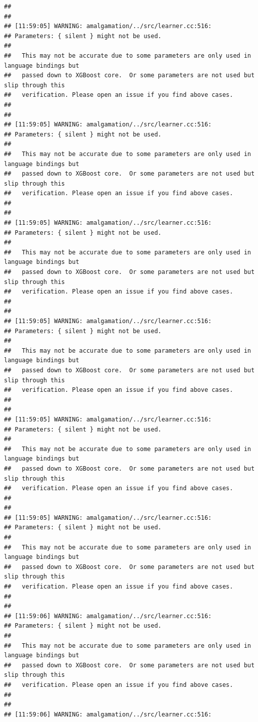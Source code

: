 \documentclass[AMS,STIX2COL]{WileyNJD-v2}\usepackage[]{graphicx}\usepackage[]{color}
\makeatletter
\newenvironment{kframe}{%
 \def\at@end@of@kframe{}%
 \ifinner\ifhmode%
  \def\at@end@of@kframe{\end{minipage}}%
  \begin{minipage}{\columnwidth}%
 \fi\fi%
 \def\FrameCommand##1{\hskip\@totalleftmargin \hskip-\fboxsep
 \colorbox{shadecolor}{##1}\hskip-\fboxsep
     \hskip-\linewidth \hskip-\@totalleftmargin \hskip\columnwidth}%
 \MakeFramed {\advance\hsize-\width
   \@totalleftmargin\z@ \linewidth\hsize
   \@setminipage}}%
 {\par\unskip\endMakeFramed%
 \at@end@of@kframe}
\newenvironment{knitrout}{}{} %
\makeatother
\begin{document}
\begin{knitrout}
\begin{kframe}
\begin{verbatim}
## 
## 
## [11:59:05] WARNING: amalgamation/../src/learner.cc:516: 
## Parameters: { silent } might not be used.
## 
##   This may not be accurate due to some parameters are only used in language bindings but
##   passed down to XGBoost core.  Or some parameters are not used but slip through this
##   verification. Please open an issue if you find above cases.
## 
## 
## [11:59:05] WARNING: amalgamation/../src/learner.cc:516: 
## Parameters: { silent } might not be used.
## 
##   This may not be accurate due to some parameters are only used in language bindings but
##   passed down to XGBoost core.  Or some parameters are not used but slip through this
##   verification. Please open an issue if you find above cases.
## 
## 
## [11:59:05] WARNING: amalgamation/../src/learner.cc:516: 
## Parameters: { silent } might not be used.
## 
##   This may not be accurate due to some parameters are only used in language bindings but
##   passed down to XGBoost core.  Or some parameters are not used but slip through this
##   verification. Please open an issue if you find above cases.
## 
## 
## [11:59:05] WARNING: amalgamation/../src/learner.cc:516: 
## Parameters: { silent } might not be used.
## 
##   This may not be accurate due to some parameters are only used in language bindings but
##   passed down to XGBoost core.  Or some parameters are not used but slip through this
##   verification. Please open an issue if you find above cases.
## 
## 
## [11:59:05] WARNING: amalgamation/../src/learner.cc:516: 
## Parameters: { silent } might not be used.
## 
##   This may not be accurate due to some parameters are only used in language bindings but
##   passed down to XGBoost core.  Or some parameters are not used but slip through this
##   verification. Please open an issue if you find above cases.
## 
## 
## [11:59:05] WARNING: amalgamation/../src/learner.cc:516: 
## Parameters: { silent } might not be used.
## 
##   This may not be accurate due to some parameters are only used in language bindings but
##   passed down to XGBoost core.  Or some parameters are not used but slip through this
##   verification. Please open an issue if you find above cases.
## 
## 
## [11:59:06] WARNING: amalgamation/../src/learner.cc:516: 
## Parameters: { silent } might not be used.
## 
##   This may not be accurate due to some parameters are only used in language bindings but
##   passed down to XGBoost core.  Or some parameters are not used but slip through this
##   verification. Please open an issue if you find above cases.
## 
## 
## [11:59:06] WARNING: amalgamation/../src/learner.cc:516: 

\end{verbatim}
\end{kframe}
\end{knitrout}
\end{document}
